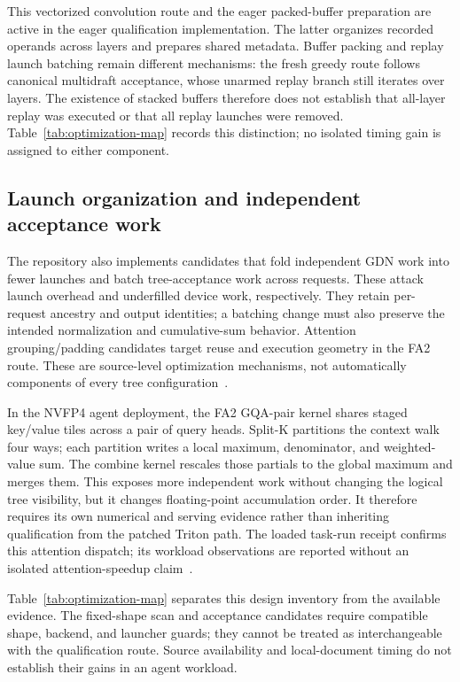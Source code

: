 \documentclass[conference]{IEEEtran}
\begin{document}
This vectorized convolution route and the eager packed-buffer preparation are active in the eager qualification implementation. The latter organizes recorded operands across layers and prepares shared metadata. Buffer packing and replay launch batching remain different mechanisms: the fresh greedy route follows canonical multidraft acceptance, whose unarmed replay branch still iterates over layers. The existence of stacked buffers therefore does not establish that all-layer replay was executed or that all replay launches were removed. Table~\ref{tab:optimization-map} records this distinction; no isolated timing gain is assigned to either component.

\subsection{Launch organization and independent acceptance work}
The repository also implements candidates that fold independent GDN work into fewer launches and batch tree-acceptance work across requests. These attack launch overhead and underfilled device work, respectively. They retain per-request ancestry and output identities; a batching change must also preserve the intended normalization and cumulative-sum behavior. Attention grouping/padding candidates target reuse and execution geometry in the FA2 route. These are source-level optimization mechanisms, not automatically components of every tree configuration~\cite{lumo2026archive}.

In the NVFP4 agent deployment, the FA2 GQA-pair kernel shares staged key/value tiles across a pair of query heads. Split-K partitions the context walk four ways; each partition writes a local maximum, denominator, and weighted-value sum. The combine kernel rescales those partials to the global maximum and merges them. This exposes more independent work without changing the logical tree visibility, but it changes floating-point accumulation order. It therefore requires its own numerical and serving evidence rather than inheriting qualification from the patched Triton path. The loaded task-run receipt confirms this attention dispatch; its workload observations are reported without an isolated attention-speedup claim~\cite{lumo2026archive}.

Table~\ref{tab:optimization-map} separates this design inventory from the available evidence. The fixed-shape scan and acceptance candidates require compatible shape, backend, and launcher guards; they cannot be treated as interchangeable with the qualification route. Source availability and local-document timing do not establish their gains in an agent workload.
\end{document}
